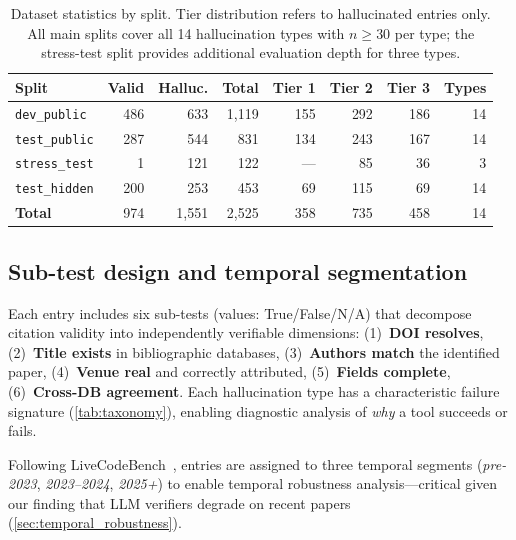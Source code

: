 \begin{table}[t]
\caption{Dataset statistics by split. Tier distribution refers to hallucinated entries only. All main splits cover all 14 hallucination types with $n \geq 30$ per type; the stress-test split provides additional evaluation depth for three types.}
\label{tab:stats}
\centering
\small
\begin{tabular}{lrrrrrrr}
\toprule
\textbf{Split} & \textbf{Valid} & \textbf{Halluc.} & \textbf{Total} & \textbf{Tier 1} & \textbf{Tier 2} & \textbf{Tier 3} & \textbf{Types} \\
\midrule
\texttt{dev\_public}   & 486 & 633 & 1,119 & 155 & 292 & 186 & 14 \\
\texttt{test\_public}  & 287 & 544 & 831 & 134 & 243 & 167 & 14 \\
\texttt{stress\_test}  & 1 & 121 & 122 & --- & 85 & 36 & 3 \\
\texttt{test\_hidden}  & 200 & 253 & 453 & 69 & 115 & 69 & 14 \\
\midrule
\textbf{Total}         & 974 & 1,551 & 2,525 & 358 & 735 & 458 & 14 \\
\bottomrule
\end{tabular}
\end{table}

\subsection{Sub-test design and temporal segmentation}
\label{sec:subtests}

Each entry includes six sub-tests (values: True/False/N/A) that decompose citation validity into independently verifiable dimensions: (1)~\textbf{DOI resolves}, (2)~\textbf{Title exists} in bibliographic databases, (3)~\textbf{Authors match} the identified paper, (4)~\textbf{Venue real} and correctly attributed, (5)~\textbf{Fields complete}, (6)~\textbf{Cross-DB agreement}.
Each hallucination type has a characteristic failure signature (\cref{tab:taxonomy}), enabling diagnostic analysis of \emph{why} a tool succeeds or fails.

\label{sec:temporal}
Following LiveCodeBench~\citep{livecodebench2024}, entries are assigned to three temporal segments (\emph{pre-2023}, \emph{2023--2024}, \emph{2025+}) to enable temporal robustness analysis---critical given our finding that LLM verifiers degrade on recent papers (\cref{sec:temporal_robustness}).
